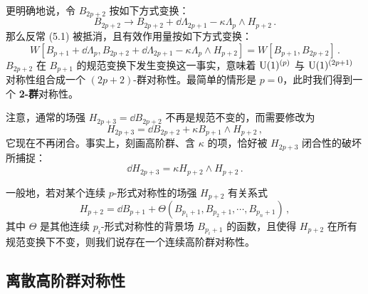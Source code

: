 
更明确地说，令 $B_{2p+2}$ 按如下方式变换：
\begin{equation}
  B_{2p+2}\to B_{2p+2}+\dd\Lambda_{2p+1}-\kappa\Lambda_p\wedge H_{p+2}\,. \tag{5.4}
\end{equation}
那么反常 (5.1) 被抵消，且有效作用量按如下方式变换：
\begin{equation}
  W[B_{p+1}+\dd\Lambda_p,B_{2p+2}+\dd\Lambda_{2p+1}-\kappa\Lambda_p\wedge H_{p+2}]
  =W[B_{p+1},B_{2p+2}]\,. \tag{5.5}
\end{equation}
$B_{2p+2}$ 在 $B_{p+1}$ 的规范变换下发生变换这一事实，意味着 $\mathrm{U}(1)^{(p)}$ 与 $\mathrm{U}(1)^{(2p+1)}$ 对称性组合成一个 $(2p+2)$-群对称性。最简单的情形是 $p=0$，此时我们得到一个 \textbf{2-群}对称性。

注意，通常的场强 $H_{2p+3}=\dd B_{2p+2}$ 不再是规范不变的，而需要修改为
\begin{equation}
  H_{2p+3}=\dd B_{2p+2}+\kappa B_{p+1}\wedge H_{p+2}\,, \tag{5.6}
\end{equation}
它现在不再闭合。事实上，刻画高阶群、含 $\kappa$ 的项，恰好被 $H_{2p+3}$ 闭合性的破坏所捕捉：
\begin{equation}
  \dd H_{2p+3}=\kappa H_{p+2}\wedge H_{p+2}\,. \tag{5.7}
\end{equation}

一般地，若对某个连续 $p$-形式对称性的场强 $H_{p+2}$ 有关系式
\begin{equation}
  H_{p+2}=\dd B_{p+1}+\Theta(B_{p_1+1},B_{p_2+1},\cdots,B_{p_n+1})\,, \tag{5.8}
\end{equation}
其中 $\Theta$ 是其他连续 $p_i$-形式对称性的背景场 $B_{p_i+1}$ 的函数，且使得 $H_{p+2}$ 在所有规范变换下不变，则我们说存在一个连续高阶群对称性。


\subsection{离散高阶群对称性}

